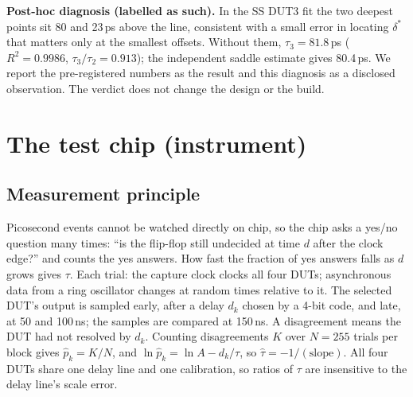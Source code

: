 \documentclass[11pt]{article}
\begin{document}
\textbf{Post-hoc diagnosis (labelled as such).} In the SS DUT3 fit the two deepest points sit 80 and 23\,ps above
the line, consistent with a small error in locating $\delta^*$ that matters only at the smallest offsets. Without
them, $\tau_3=81.8$\,ps ($R^2=0.9986$, $\tau_3/\tau_2=0.913$); the independent saddle estimate gives 80.4\,ps. We
report the pre-registered numbers as the result and this diagnosis as a disclosed observation. The verdict does not
change the design or the build.

\section{The test chip (instrument)}
\label{sec:instrument}
\subsection{Measurement principle}
Picosecond events cannot be watched directly on chip, so the chip asks a yes/no question many times: ``is the flip-flop
still undecided at time $d$ after the clock edge?'' and counts the yes answers. How fast the fraction of yes answers
falls as $d$ grows gives $\tau$.
Each trial: the capture clock clocks all four DUTs; asynchronous data from a ring oscillator changes at random
times relative to it. The selected DUT's output is sampled early, after a delay $d_k$ chosen by a 4-bit code, and
late, at 50 and 100\,ns; the samples are compared at 150\,ns. A disagreement means the DUT had not resolved by
$d_k$. Counting disagreements $K$ over $N=255$ trials per block gives $\hat p_k = K/N$, and
$\ln \hat p_k = \ln A - d_k/\tau$, so $\hat\tau = -1/(\text{slope})$. All four DUTs share one delay line and one
calibration, so ratios of $\tau$ are insensitive to the delay line's scale error.
\end{document}

